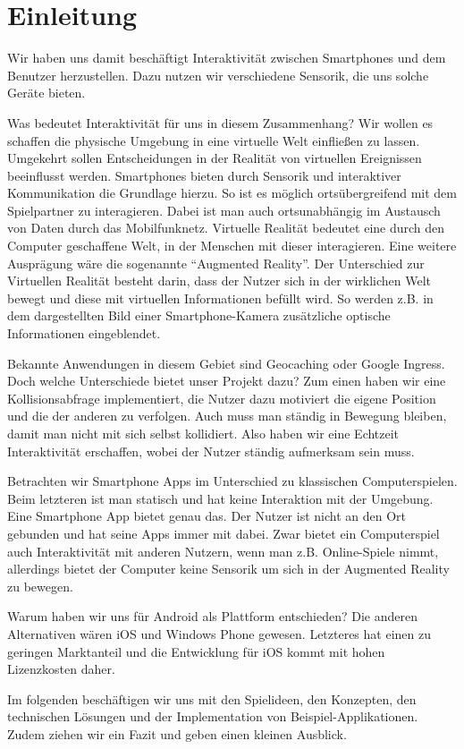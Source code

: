 \chapter{Einleitung}
Wir haben uns damit beschäftigt Interaktivität zwischen Smartphones und dem Benutzer herzustellen. Dazu nutzen wir verschiedene Sensorik, die uns solche Geräte bieten.

Was bedeutet Interaktivität für uns in diesem Zusammenhang? Wir wollen es schaffen die physische Umgebung in eine virtuelle Welt einfließen zu lassen. Umgekehrt sollen Entscheidungen in der Realität von virtuellen Ereignissen beeinflusst werden.
Smartphones bieten durch Sensorik und interaktiver Kommunikation die Grundlage hierzu. So ist es möglich ortsübergreifend mit dem Spielpartner zu interagieren. Dabei ist man auch ortsunabhängig im Austausch von Daten durch das Mobilfunknetz. 
Virtuelle Realität bedeutet eine durch den Computer geschaffene Welt, in der Menschen mit dieser interagieren.
Eine weitere Ausprägung wäre die sogenannte “Augmented Reality”. Der Unterschied zur Virtuellen Realität besteht darin, dass der Nutzer sich in der wirklichen Welt bewegt und diese mit virtuellen Informationen befüllt wird. So werden z.B. in dem dargestellten Bild einer Smartphone-Kamera zusätzliche optische Informationen eingeblendet.

Bekannte Anwendungen in diesem Gebiet sind Geocaching oder Google Ingress. Doch welche Unterschiede bietet unser Projekt dazu?
Zum einen haben wir eine Kollisionsabfrage implementiert, die Nutzer dazu motiviert die eigene Position und die der anderen zu verfolgen. Auch muss man ständig in Bewegung bleiben, damit man nicht mit sich selbst kollidiert. Also haben wir eine Echtzeit Interaktivität erschaffen, wobei der Nutzer ständig aufmerksam sein muss. 

Betrachten wir Smartphone Apps im Unterschied zu klassischen Computerspielen. Beim letzteren ist man statisch und hat keine Interaktion mit der Umgebung. Eine Smartphone App bietet genau das. Der Nutzer ist nicht an den Ort gebunden und hat seine Apps immer mit dabei. 
Zwar bietet ein Computerspiel auch Interaktivität mit anderen Nutzern, wenn man z.B. Online-Spiele nimmt, allerdings bietet der Computer keine Sensorik um sich in der Augmented Reality zu bewegen.

Warum haben wir uns für Android als Plattform entschieden? Die anderen Alternativen wären iOS und Windows Phone gewesen. Letzteres hat einen zu geringen Marktanteil \cite{android} und die Entwicklung für iOS kommt mit hohen Lizenzkosten daher.  

Im folgenden beschäftigen wir uns mit den Spielideen, den Konzepten, den technischen Lösungen und der Implementation von Beispiel-Applikationen. Zudem ziehen wir ein Fazit und geben einen kleinen Ausblick.

\newpage
